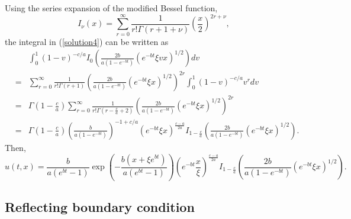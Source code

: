\documentclass[12pt]{article}
\begin{document}
    Using the series expansion of the modified Bessel function,
    \begin{equation}
      I_{\nu}(x) = \sum_{r=0}^{\infty}\frac{1}{r!\Gamma(r+1+\nu)}\left(\frac{x}{2}\right)^{2r+\nu},
    \end{equation}
    the integral in (\ref{solution4}) can be written as
    \begin{eqnarray}
       && \int_0^1(1-v)^{-c/a}I_0\left(\frac{2b}{a(1-e^{-bt})}\left(e^{-bt}\xi v x\right)^{1/2}\right)dv \nonumber\\
      &=& \sum_{r=0}^{\infty}\frac{1}{r!\Gamma(r+1)}\left(\frac{2b}{a(1-e^{-bt})}\left(e^{-bt}\xi x\right)^{1/2}\right)^{2r}\int_0^1(1-v)^{-c/a}v^rdv \nonumber\\
      &=& \Gamma\left(1-\frac{c}{a}\right)\sum_{r=0}^{\infty}\frac{1}{\displaystyle r!\Gamma\left(r-\frac{c}{a}+2\right)}
              \left(\frac{2b}{a(1-e^{-bt})}\left(e^{-bt}\xi x\right)^{1/2}\right)^{2r} \nonumber\\
      &=& \Gamma\left(1-\frac{c}{a}\right)\left(\frac{b}{a(1-e^{-bt})}\right)^{-1+c/a}\left(e^{-bt}\xi x\right)^{\frac{c-a}{2a}}I_{1-\frac{c}{a}}
              \left(\frac{2b}{a(1-e^{-bt})}\left(e^{-bt}\xi x\right)^{1/2}\right).
    \end{eqnarray}
    Then,
    \begin{equation}
      u(t,x) = \frac{b}{a(e^{bt}-1)}\exp\left(-\frac{b(x+\xi e^{bt})}{a(e^{bt}-1)}\right)
                \left(e^{-bt}\frac{x}{\xi}\right)^{\frac{c-a}{2a}}I_{1-\frac{c}{a}}\left(\frac{2b}{a(1-e^{-bt})}\left(e^{-bt}\xi x\right)^{1/2}\right).
    \end{equation}

  \subsection{Reflecting boundary condition}
\end{document}
